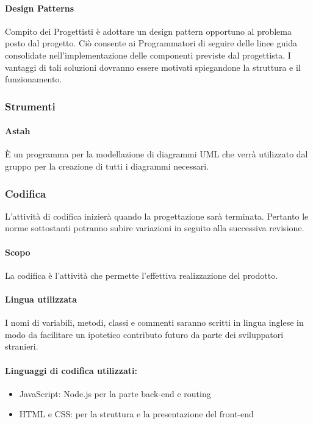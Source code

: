\documentclass[11pt,a4paper]{article}
\begin{document}
{	\paragraph{Design Patterns\\} 
	Compito dei Progettisti è adottare un design pattern opportuno al problema posto dal progetto. Ciò consente ai Programmatori di seguire delle linee guida consolidate nell'implementazione delle componenti previste dal progettista. I vantaggi di tali soluzioni dovranno essere motivati spiegandone la struttura e il funzionamento.
	\subsubsection{Strumenti}
	\paragraph{Astah\\}
	È un programma per la modellazione di diagrammi UML che verrà utilizzato dal gruppo per la creazione di tutti i diagrammi necessari.
	
	\subsubsection{Codifica}
	L'attività di codifica inizierà quando la progettazione sarà terminata. Pertanto le norme sottostanti potranno subire variazioni in seguito alla successiva revisione.
	

	\paragraph{Scopo}
	La codifica è l'attività che permette l'effettiva realizzazione del prodotto.
		
	\paragraph{Lingua utilizzata}
 
	I nomi di variabili, metodi, classi e commenti saranno scritti in lingua inglese in modo da facilitare un ipotetico contributo futuro da parte dei sviluppatori stranieri.
	
	\paragraph{Linguaggi di codifica utilizzati:}
	\begin{itemize}
		\item JavaScript: Node.js per la parte back-end e routing
		\item HTML e CSS: per la struttura e la presentazione del front-end
	\end{itemize}
	
}
\end{document}
